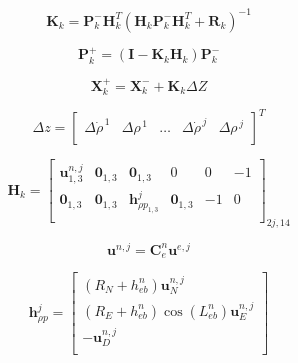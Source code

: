 \begin{equation}\label{eq:L}
    \mathbf{K}_k = \mathbf{P}^-_k \mathbf{H}^T_k\left(\mathbf{H}_k\mathbf{P}^-_k\mathbf{H}^T_k + \mathbf{R}_k\right)^{-1}
\end{equation}

\begin{equation}\label{eq:pplus}
    \mathbf{P}^+_k = \left(\mathbf{I} - \mathbf{K}_k\mathbf{H}_k\right)\mathbf{P}^-_k
\end{equation}

\begin{equation}\label{eq:xplus}
    \mathbf{X}_k^+ = \mathbf{X}^-_k + \mathbf{K}_k\Delta Z
\end{equation}

\begin{equation}\label{eq:deltaZ}
    \Delta z = \begin{bmatrix}
        \Delta\dot{\rho}^{\,1} & \Delta{\rho}^{\,1} & \hdots & \Delta\dot{\rho}^{\,j} & \Delta{\rho}^{\,j} \\
    \end{bmatrix}^T
\end{equation}

\begin{equation}\label{eq:H}
    \mathbf{H}_k = \begin{bmatrix}
        \mathbf{u}^{n,j}_{1,3} & \mathbf{0}_{1,3} & \mathbf{0}_{1,3}            & 0                & 0  & -1 \\
        \mathbf{0}_{1,3}       & \mathbf{0}_{1,3} & \mathbf{h}^j_{\rho p_{1,3}} & \mathbf{0}_{1,3} & -1 & 0  \\
    \end{bmatrix}_{2j,14}
\end{equation}

\begin{equation}\label{eq:nav_u}
    \mathbf{u}^{n,j} = \mathbf{C}_e^n \mathbf{u}^{e,j}
\end{equation}

\begin{equation}\label{eq:nav_h}
    \mathbf{h}^j_{\rho p} =
    \begin{bmatrix}
        \left(R_N + h^n_{eb}\right)\mathbf{u}^{n,j}_N               \\
        \left(R_E + h_{eb}^n\right)\cos(L^n_{eb})\mathbf{u}^{n,j}_E \\
        -\mathbf{u}^{n,j}_D                                         \\
    \end{bmatrix}
\end{equation}

